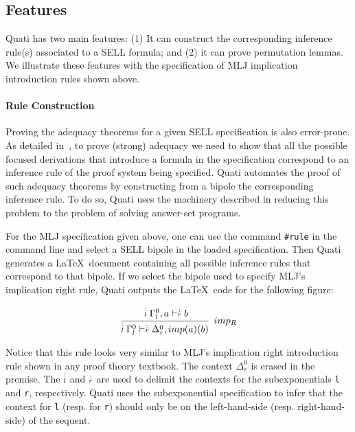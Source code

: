 \documentclass{llncs}
\newcommand{\ndots}[1]{\stackrel{\vcenter{\hbox{$\scriptstyle :$}\vskip-.35ex}}
   {\hbox {$ \scriptstyle {#1}$}}}
\begin{document}

\subsection{Features}

Quati has two main features: (1) It can construct the corresponding inference rule(s) associated
to a SELL formula; and (2) it can prove permutation lemmas. We illustrate these features with 
the specification of MLJ implication introduction rules shown above.

\vspace{-2mm}

\paragraph{Rule Construction} Proving the adequacy theorems for a given SELL specification is also 
error-prone. As detailed in~\cite{nigam.jlc}, to prove (strong) adequacy we need to show that all 
the possible focused derivations that introduce a formula in the specification correspond to 
an inference rule of the proof system being specified. Quati automates the proof of such 
adequacy theorems by constructing from a bipole the corresponding inference rule. 
To do so, Quati uses the machinery described in \cite{nigam13iclp,nigam14ebl} reducing
this problem to the problem of solving answer-set programs. 

For the MLJ specification given above, one can use the command \texttt{\#rule} in the command 
line and select a SELL bipole in the loaded specification. Then Quati generates
a \LaTeX\ document containing all possible inference rules that correspond to that bipole. If we select the bipole used to specify 
MLJ's implication right rule, Quati outputs the \LaTeX\ code for the following figure:
\vspace{-3mm}

{\small
\[
\cfrac{ \ndots{l} \Gamma_{l}^{0}, a \vdash  \ndots{r} b}
{ \ndots{l} \Gamma_{l}^{0} \vdash  \ndots{r} \Delta_{r}^{0}, imp (a) (b) } \;\; imp_{R}
\]
}

Notice that this rule looks very similar to MLJ's implication right introduction rule shown in any proof theory 
textbook. The context $\Delta_{r}^{0}$ is erased in the premise. The $\ndots{l}$ and $\ndots{r}$ are used to 
delimit the contexts for the subexponentials \texttt{l} and \texttt{r}, respectively. Quati uses the subexponential 
specification to infer that the context for \texttt{l} (resp. for \texttt{r})
should only be on the left-hand-side (resp. right-hand-side) of the sequent.
\end{document}
